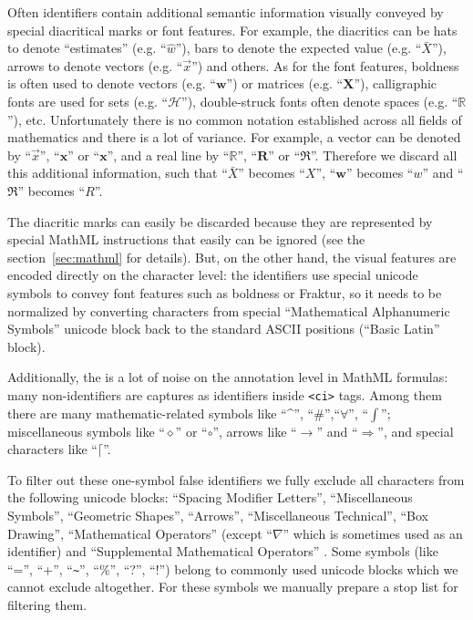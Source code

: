 Often identifiers contain additional semantic information visually conveyed 
by special diacritical marks or font features. For example, the diacritics can be   
hats to denote ``estimates'' (e.g. ``$\hat w$''), bars to denote the expected value 
(e.g. ``$\bar X$''), arrows to denote vectors (e.g. ``$\overrightarrow x$'') and others.
As for the font features, boldness is often used to
denote vectors (e.g. ``$\mathbf w$'') or matrices (e.g. ``$\mathbf X$''), calligraphic fonts are 
used for sets (e.g. ``$\mathcal H$''), double-struck fonts often denote spaces 
(e.g. ``$\mathbb R$''), etc. 
Unfortunately there is no common notation established across all fields of
mathematics and there is a lot of variance. For example, 
a vector can be denoted by ``$\overrightarrow x$'', ``$\boldsymbol x$'' or ``$\mathbf x$'', 
and a real line by ``$\mathbb R$'', ``$\mathbf R$'' or ``$\mathfrak R$''. 
Therefore we discard all this additional information, such that
``$\bar X$'' becomes ``$X$'', ``$\mathbf w$'' becomes ``$w$'' and ``$\mathfrak R$'' 
becomes ``$R$''.


The diacritic marks can easily be discarded because they are represented 
by special MathML instructions that easily can be ignored 
(see the section~\ref{sec:mathml} for details). But, on the other hand,
the visual features are encoded directly on the character level: 
the identifiers use special unicode symbols to convey font features such 
as boldness or Fraktur, so it needs to be normalized by converting characters
from special ``Mathematical Alphanumeric Symbols'' unicode block \cite{allen2007unicode}
back to the standard ASCII positions (``Basic Latin'' block).

Additionally, the is a lot of noise on the annotation level in MathML formulas: 
many non-identifiers are captures as identifiers inside \verb|<ci>| tags. Among 
them there are many mathematic-related symbols
like ``\textasciicircum'', ``\#'',``$\forall$'', ``$\int$''; 
miscellaneous symbols like ``$\diamond$'' or
``$\circ$'', arrows like ``$\to$'' and ``$\Rightarrow$'', and special characters like
``$\lceil$''.

To filter out these one-symbol false identifiers we fully exclude all characters from 
the following unicode blocks: ``Spacing Modifier Letters'', ``Miscellaneous Symbols'', 
``Geometric Shapes'', ``Arrows'', ``Miscellaneous Technical'', ``Box Drawing'', 
``Mathematical Operators'' (except ``$\nabla$'' which is sometimes used as an identifier)
and ``Supplemental Mathematical Operators'' \cite{allen2007unicode}.
Some symbols (like ``='', ``+'', ``\verb|~|'', ``\%'', ``?'', ``!'')
belong to commonly used unicode blocks which we cannot exclude altogether. 
For these symbols we manually prepare a stop list for filtering them.


